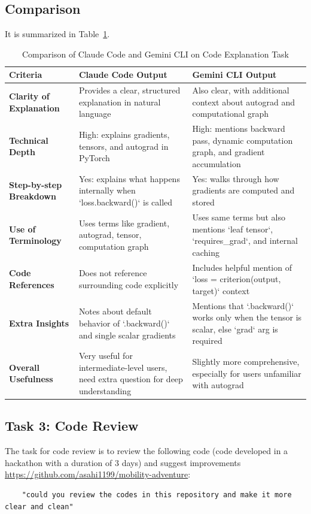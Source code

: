 \documentclass[9.5pt]{article}
\begin{document}
\subsection{Comparison}
It is summarized in Table~\ref{tab:code_explanation_comparison}.
\begin{table}[htp]
\centering
\caption{Comparison of Claude Code and Gemini CLI on Code Explanation Task}
\label{tab:code_explanation_comparison}
\renewcommand{\arraystretch}{1.2}
\begin{tabularx}{\textwidth}{|X|X|X|}
\hline
\textbf{Criteria} & \textbf{Claude Code Output} & \textbf{Gemini CLI Output} \\
\hline
\textbf{Clarity of Explanation} & Provides a clear, structured explanation in natural language & Also clear, with additional context about autograd and computational graph \\
\hline
\textbf{Technical Depth} & High: explains gradients, tensors, and autograd in PyTorch & High: mentions backward pass, dynamic computation graph, and gradient accumulation \\
\hline
\textbf{Step-by-step Breakdown} & Yes: explains what happens internally when `loss.backward()` is called & Yes: walks through how gradients are computed and stored \\
\hline
\textbf{Use of Terminology} & Uses terms like gradient, autograd, tensor, computation graph & Uses same terms but also mentions `leaf tensor`, `requires\_grad`, and internal caching \\
\hline
\textbf{Code References} & Does not reference surrounding code explicitly & Includes helpful mention of `loss = criterion(output, target)` context \\
\hline
\textbf{Extra Insights} & Notes about default behavior of `.backward()` and single scalar gradients & Mentions that `.backward()` works only when the tensor is scalar, else `grad` arg is required \\
\hline
\textbf{Overall Usefulness} & Very useful for intermediate-level users, need extra question for deep understanding & Slightly more comprehensive, especially for users unfamiliar with autograd \\
\hline
\end{tabularx}
\end{table}

\subsection{Task 3: Code Review}
The task for code review is to review the following code (code developed in a hackathon with a duration of 3 days) and suggest improvements \url{https://github.com/asahi1199/mobility-adventure}:
\begin{verbatim}
    "could you review the codes in this repository and make it more clear and clean"
\end{verbatim}
\end{document}
